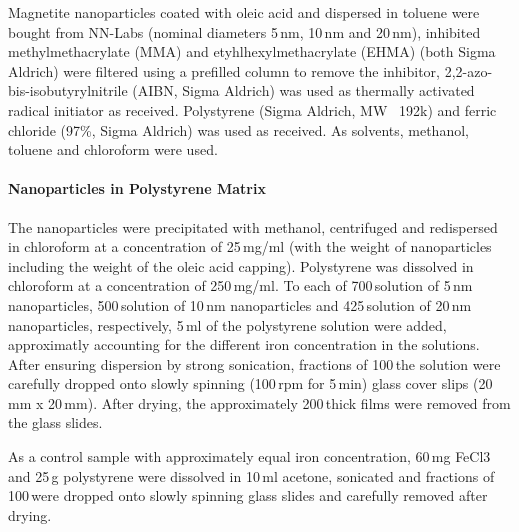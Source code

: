 Magnetite nanoparticles coated with oleic acid and dispersed in toluene were bought from NN-Labs (nominal diameters 5\,nm, 10\,nm and 20\,nm), inhibited methylmethacrylate (MMA) and etyhlhexylmethacrylate (EHMA)  (both Sigma Aldrich) were filtered using a prefilled column to remove the inhibitor,  2,2-azo-bis-isobutyrylnitrile (AIBN, Sigma Aldrich) was used as thermally activated radical initiator as received. Polystyrene (Sigma Aldrich, MW ~192k) and ferric chloride (97\%, Sigma Aldrich) was used as received. As solvents, methanol, toluene and chloroform were used.
\paragraph{Nanoparticles in Polystyrene Matrix} 
The nanoparticles were precipitated with methanol, centrifuged and redispersed in chloroform at a concentration of 25\,mg/ml (with the weight of nanoparticles including the weight of the oleic acid capping). Polystyrene was dissolved in chloroform at a concentration of 250\,mg/ml. 
To each of 700\,\microliter solution of 5\,nm nanoparticles, 500\,\microliter solution of 10\,nm nanoparticles and 425\,\microliter solution of 20\,nm nanoparticles, respectively, 5\,ml of the polystyrene solution were added, approximatly accounting for the different iron concentration in the solutions.  After ensuring dispersion by strong sonication, fractions of 100\,\microliter the solution were carefully dropped onto slowly spinning (100\,rpm for 5\,min) glass cover slips (20\,mm x 20\,mm). After drying, the approximately 200\,\micrometer thick films were removed from the glass slides.

As a control sample with approximately equal iron concentration, 60\,mg FeCl3 and 25\,g polystyrene were dissolved in 10\,ml acetone, sonicated and  fractions of 100\,\microliter were dropped onto slowly spinning glass slides  and carefully removed after drying.

